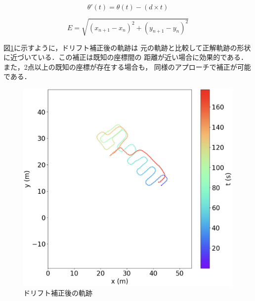 \begin{equation}
    \theta'(t) = \theta(t) - (d \times t)
    \label{eq:drift_correction}
\end{equation}


\begin{equation}
    E = \sqrt{(x_{n+1} - x_n)^2 + (y_{n+1} - y_n)^2}
    \label{eq:euclidean_distance}
\end{equation}



図\ref{fig:pdr-remove-drift}に示すように，ドリフト補正後の軌跡は
元の軌跡と比較して正解軌跡の形状に近づいている．この補正は既知の座標間の
距離が近い場合に効果的である．また，2点以上の既知の座標が存在する場合も，
同様のアプローチで補正が可能である．

\begin{figure}[H]
	\centering
	\includegraphics[width=\linewidth]{../image/pdr-remove-drift-two.jpg}
	\caption{ドリフト補正後の軌跡}    \label{fig:pdr-remove-drift}
\end{figure}


